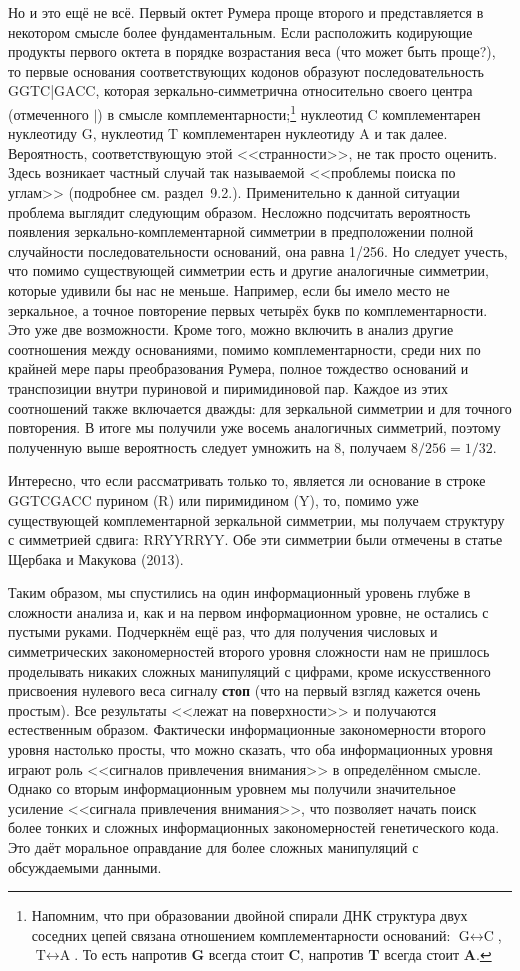 \documentclass[12pt]{article}
\begin{document}
Но и это ещё не всё. Первый октет Румера проще второго и представляется в некотором смысле более фундаментальным. Если расположить кодирующие продукты первого октета в порядке возрастания веса (что может быть проще?), то первые основания соответствующих кодонов образуют последовательность GGTC|GACC, которая зеркально-симметрична относительно своего центра (отмеченного $|$) в смысле комплементарности;\footnote{Напомним, что при образовании двойной спирали ДНК структура двух соседних цепей связана отношением комплементарности оснований: $\text{G} \leftrightarrow \text{C}$, $\text{T} \leftrightarrow \text{A}$. То есть напротив \textbf{G} всегда стоит \textbf{C}, напротив \textbf{T} всегда стоит \textbf{A}.} нуклеотид C комплементарен нуклеотиду G, нуклеотид T комплементарен нуклеотиду A и так далее. Вероятность, соответствующую этой <<странности>>, не так просто оценить. Здесь возникает частный случай так называемой <<проблемы поиска по углам>> (подробнее см. раздел~9.2.). Применительно к данной ситуации проблема выглядит следующим образом. Несложно подсчитать вероятность появления зеркально-комплементарной симметрии в предположении полной случайности последовательности оснований, она равна 1/256. Но следует учесть, что помимо существующей симметрии есть и другие аналогичные симметрии, которые удивили бы нас не меньше. Например, если бы имело место не зеркальное, а точное повторение первых четырёх букв по комплементарности. Это уже две возможности. Кроме того, можно включить в анализ другие соотношения между основаниями, помимо комплементарности, среди них по крайней мере пары преобразования Румера, полное тождество оснований и транспозиции внутри пуриновой и пиримидиновой пар. Каждое из этих соотношений также включается дважды: для зеркальной симметрии и для точного повторения. В итоге мы получили уже восемь аналогичных симметрий, поэтому полученную выше вероятность следует умножить на 8, получаем $8/256 = 1/32$.

Интересно, что если рассматривать только то, является ли основание в строке GGTCGACC пурином (R) или пиримидином (Y), то, помимо уже существующей комплементарной зеркальной симметрии, мы получаем структуру с симметрией сдвига: RRYYRRYY. Обе эти симметрии были отмечены в статье Щербака и Макукова (2013).

Таким образом, мы спустились на один информационный уровень глубже в сложности анализа и, как и на первом информационном уровне, не остались с пустыми руками. Подчеркнём ещё раз, что для получения числовых и симметрических закономерностей второго уровня сложности нам не пришлось проделывать никаких сложных манипуляций с цифрами, кроме искусственного присвоения нулевого веса сигналу \textbf{стоп} (что на первый взгляд кажется очень простым). Все результаты <<лежат на поверхности>> и получаются естественным образом. Фактически информационные закономерности второго уровня настолько просты, что можно сказать, что оба информационных уровня играют роль <<сигналов привлечения внимания>> в определённом смысле. Однако со вторым информационным уровнем мы получили значительное усиление <<сигнала привлечения внимания>>, что позволяет начать поиск более тонких и сложных информационных закономерностей генетического кода. Это даёт моральное оправдание для более сложных манипуляций с обсуждаемыми данными.
\end{document}
